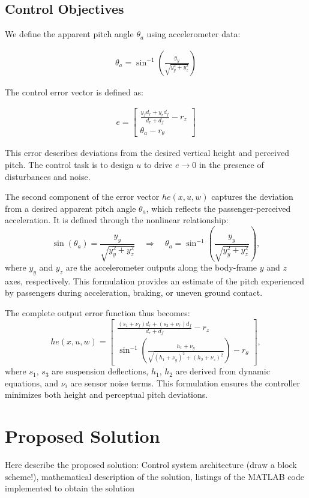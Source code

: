 \documentclass[]{report}
\begin{document}
\newpage
\subsection{Control Objectives}

We define the apparent pitch angle $\theta_a$ using accelerometer data:

\begin{align}
	\theta_a = \sin^{-1} \left( \frac{y_y}{\sqrt{y_y^2 + y_z^2}} \right)
\end{align}

The control error vector is defined as:

\begin{align}
	e = \begin{bmatrix}
		\frac{y_f d_r + y_r d_f}{d_r + d_f} - r_z \\
		\theta_a - r_\theta
	\end{bmatrix}
\end{align}

This error describes deviations from the desired vertical height and perceived pitch. The control task is to design $u$ to drive $e \rightarrow 0$ in the presence of disturbances and noise.

The second component of the error vector $he(x,u,w)$ captures the deviation from a desired apparent pitch angle $\theta_a$, which reflects the passenger-perceived acceleration. It is defined through the nonlinear relationship:
\[
\sin(\theta_a) = \frac{y_y}{\sqrt{y_y^2 + y_z^2}} \quad \Rightarrow \quad \theta_a = \sin^{-1}\left(\frac{y_y}{\sqrt{y_y^2 + y_z^2}}\right),
\]
where $y_y$ and $y_z$ are the accelerometer outputs along the body-frame $y$ and $z$ axes, respectively. This formulation provides an estimate of the pitch experienced by passengers during acceleration, braking, or uneven ground contact.


The complete output error function thus becomes:
\[
he(x, u, w) =
\begin{bmatrix}
	\displaystyle \frac{(s_1 + \nu_f) d_r + (s_3 + \nu_r) d_f}{d_r + d_f} - r_z \\
	\displaystyle \sin^{-1}\left( \frac{h_1 + \nu_y}{\sqrt{(h_1 + \nu_y)^2 + (h_2 + \nu_z)^2}} \right) - r_\theta
\end{bmatrix},
\]
where $s_1$, $s_3$ are suspension deflections, $h_1$, $h_2$ are derived from dynamic equations, and $\nu_i$ are sensor noise terms. This formulation ensures the controller minimizes both height and perceptual pitch deviations.

\section{Proposed Solution}
Here describe the proposed solution: Control system architecture (draw a block scheme!), mathematical description of the solution, listings of the MATLAB code implemented to obtain the solution
\end{document}
